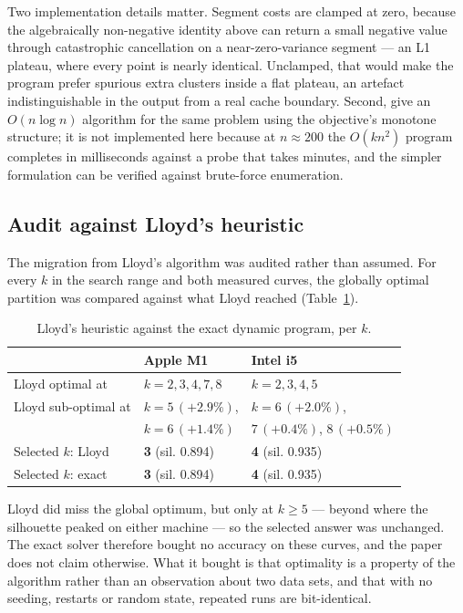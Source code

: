 \documentclass[conference]{IEEEtran}
\begin{document}
Two implementation details matter. Segment costs are clamped at zero, because the
algebraically non-negative identity above can return a small negative value
through catastrophic cancellation on a near-zero-variance segment --- an L1
plateau, where every point is nearly identical. Unclamped, that would make the
program prefer spurious extra clusters inside a flat plateau, an artefact
indistinguishable in the output from a real cache boundary. Second,
\citet{gronlund2017} give an $O(n \log n)$ algorithm for the same problem using
the objective's monotone structure; it is not implemented here because at
$n \approx 200$ the $O(kn^2)$ program completes in milliseconds against a probe
that takes minutes, and the simpler formulation can be verified against
brute-force enumeration.

\subsection{Audit against Lloyd's heuristic}

The migration from Lloyd's algorithm was audited rather than assumed. For every
$k$ in the search range and both measured curves, the globally optimal partition
was compared against what Lloyd reached (Table~\ref{tab:lloyd}).

\begin{table}[h]
\caption{Lloyd's heuristic against the exact dynamic program, per $k$.}
\label{tab:lloyd}
\centering
\footnotesize
\begin{tabular}{@{}lll@{}}
\toprule
& \textbf{Apple M1} & \textbf{Intel i5} \\
\midrule
Lloyd optimal at      & $k=2,3,4,7,8$ & $k=2,3,4,5$ \\
Lloyd sub-optimal at  & $k=5\,(+2.9\%)$, & $k=6\,(+2.0\%)$, \\
                      & $k=6\,(+1.4\%)$  & $7\,(+0.4\%)$, $8\,(+0.5\%)$ \\
Selected $k$: Lloyd   & \textbf{3} (sil. 0.894) & \textbf{4} (sil. 0.935) \\
Selected $k$: exact   & \textbf{3} (sil. 0.894) & \textbf{4} (sil. 0.935) \\
\bottomrule
\end{tabular}
\end{table}

Lloyd did miss the global optimum, but only at $k \geq 5$ --- beyond where the
silhouette peaked on either machine --- so the selected answer was unchanged. The
exact solver therefore bought no accuracy on these curves, and the paper does not
claim otherwise. What it bought is that optimality is a property of the algorithm
rather than an observation about two data sets, and that with no seeding, restarts
or random state, repeated runs are bit-identical.
\end{document}

